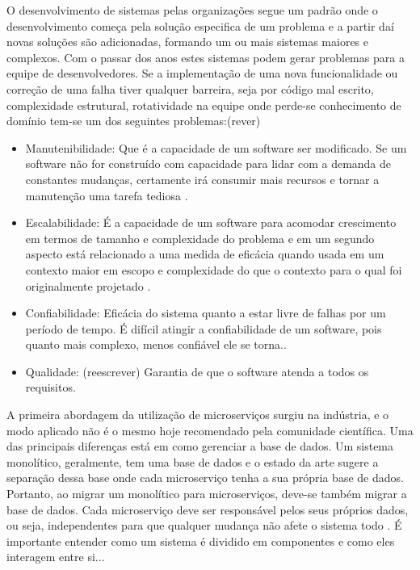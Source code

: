 \documentclass[12pt]{article}
\begin{document}
O desenvolvimento de sistemas pelas organizações segue um padrão onde o desenvolvimento começa pela solução especifica de um problema e a partir daí novas soluções são adicionadas, formando um ou mais sistemas maiores e complexos. Com o passar dos anos estes sistemas podem gerar problemas para a equipe de desenvolvedores. Se a implementação de uma nova funcionalidade ou correção de uma falha tiver qualquer barreira, seja por código mal escrito, complexidade estrutural, rotatividade na equipe onde perde-se conhecimento de domínio tem-se um dos seguintes problemas:(rever)
\begin{itemize}
	\item Manutenibilidade: Que é a capacidade de um software ser modificado. Se um software não for construído com capacidade para lidar com a demanda de constantes mudanças, certamente irá consumir mais recursos e tornar a manutenção uma tarefa tediosa \cite{Velmourougan2014}.
	\item Escalabilidade: É a capacidade de um software para acomodar crescimento em termos de tamanho e complexidade do problema e em um segundo aspecto está relacionado a uma medida de eficácia quando usada em um contexto maior em escopo e complexidade do que o contexto para o qual foi originalmente projetado \cite{Ibrahim2009}.
	\item Confiabilidade: Eficácia do sistema quanto a estar livre de falhas por um período de tempo. É difícil atingir a confiabilidade de um software, pois quanto mais complexo, menos confiável ele se torna.\cite{pan1999}.
	\item Qualidade: (reescrever) Garantia de que o software atenda a todos os requisitos.
\end{itemize}

A primeira abordagem da utilização de microserviços surgiu na indústria, e o modo aplicado não é o mesmo hoje recomendado pela comunidade científica. Uma das principais diferenças está em como gerenciar a base de dados. Um sistema monolítico, geralmente, tem uma base de dados e o estado da arte sugere a separação dessa base onde cada microserviço tenha a sua própria base de dados. Portanto, ao migrar um monolítico para microserviços, deve-se também migrar a base de dados. Cada microserviço deve ser responsável pelos seus próprios dados, ou seja, independentes para que qualquer mudança não afete o sistema todo \cite{Kholy2019}. É importante entender como um sistema é dividido em componentes e como eles interagem entre si...
\end{document}
